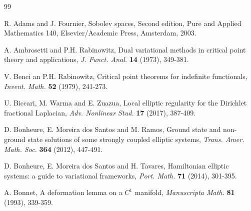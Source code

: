 \documentclass[10pt]{article}
\numberwithin{equation}{section}
\numberwithin{equation}{section}
\begin{document}
\begin{thebibliography}{99}

 R. Adams and J. Fournier, Sobolev spaces, Second edition, Pure and Applied Mathematics 140, Elsevier/Academic Press, Amsterdam, 2003.




 A. Ambrosetti and P.H. Rabinowitz, Dual variational methods in critical point theory and applications, {\it J. Funct. Anal.} {\bf 14} (1973), 349-381.





 V. Benci an P.H. Rabinowitz, Critical point theorems for indefinite functionals, {\it Invent. Math.} {\bf 52} (1979), 241-273.


 U. Biccari, M. Warma and E. Zuazua, Local elliptic regularity for the Dirichlet fractional Laplacian, {\it Adv. Nonlinear Stud.} {\bf 17} (2017), 387-409.


 D. Bonheure, E. Moreira dos Santos and M. Ramos, Ground state and non-ground state solutions of some strongly coupled elliptic systems, {\it Trans. Amer. Math. Soc.} {\bf 364} (2012), 447-491.

 D. Bonheure, E. Moreira dos Santos and H. Tavares, Hamiltonian elliptic systems: a guide to variational frameworks, {\it Port. Math.} {\bf 71} (2014), 301-395.

 A. Bonnet,
A deformation lemma on a $C^1$ manifold,
{\it Manuscripta Math.} {\bf 81} (1993), 339-359.




\end{thebibliography}
\end{document}
